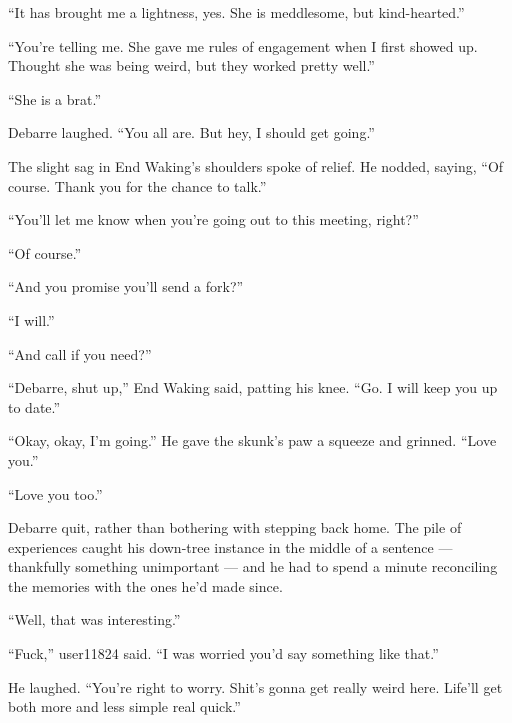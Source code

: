 ``It has brought me a lightness, yes. She is meddlesome, but kind-hearted.''

``You're telling me. She gave me rules of engagement when I first showed up. Thought she was being weird, but they worked pretty well.''

``She is a brat.''

Debarre laughed. ``You all are. But hey, I should get going.''

The slight sag in End Waking's shoulders spoke of relief. He nodded, saying, ``Of course. Thank you for the chance to talk.''

``You'll let me know when you're going out to this meeting, right?''

``Of course.''

``And you promise you'll send a fork?''

``I will.''

``And call if you need?''

``Debarre, shut up,'' End Waking said, patting his knee. ``Go. I will keep you up to date.''

``Okay, okay, I'm going.'' He gave the skunk's paw a squeeze and grinned. ``Love you.''

``Love you too.''

Debarre quit, rather than bothering with stepping back home. The pile of experiences caught his down-tree instance in the middle of a sentence — thankfully something unimportant — and he had to spend a minute reconciling the memories with the ones he'd made since.

``Well, that was interesting.''

``Fuck,'' user11824 said. ``I was worried you'd say something like that.''

He laughed. ``You're right to worry. Shit's gonna get really weird here. Life'll get both more and less simple real quick.''
